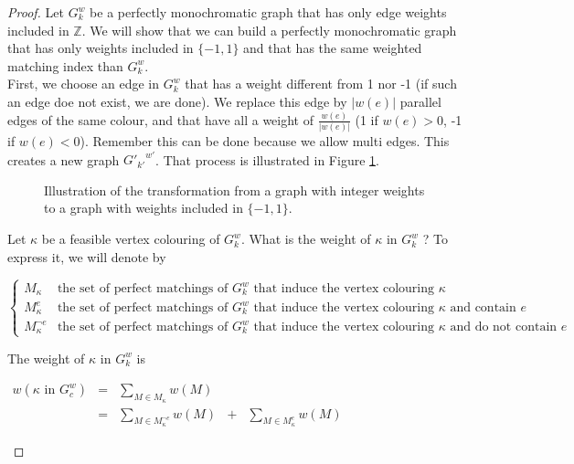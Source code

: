 \begin{proof}
    Let $G_k^w$ be a perfectly monochromatic graph that has only edge weights included in $\mathbb{Z}$. We will show that we can build a perfectly monochromatic graph that has only weights included in $\{-1, 1\}$ and that has the same weighted matching index than $G_k^w$. \\

    First, we choose an edge in $G_k^w$ that has a weight different from 1 nor -1 (if such an edge doe not exist, we are done). We replace this edge by $|w(e)|$ parallel edges of the same colour, and that have all a weight of $\frac{w(e)}{|w(e)|}$ (1 if $w(e) > 0$, -1 if $w(e) < 0$). Remember this can be done because we allow multi edges. This creates a new graph ${G'_{k'}}^{w'}$. That process is illustrated in Figure \ref{fig:demo_integers}.\\

    \begin{figure}[H]
        \caption{Illustration of the transformation from a graph with integer weights to a graph with weights included in $\{-1, 1\}$.}
        \label{fig:demo_integers}
    \end{figure}
    
    Let $\kappa$ be a feasible vertex colouring of $G_k^w$. What is the weight of $\kappa$ in $G_k^w$ ? To express it, we will denote by 
    \begin{center}
        $\left\{
            \begin{array}{ll}
                M_{\kappa}          & \mbox{the set of perfect matchings of } G_k^w \mbox{ that induce the vertex colouring } \kappa \\
                M_{\kappa}^e        & \mbox{the set of perfect matchings of } G_k^w \mbox{ that induce the vertex colouring } \kappa \mbox{ and contain } e \\
                M_{\kappa}^{\neg e} & \mbox{the set of perfect matchings of } G_k^w \mbox{ that induce the vertex colouring } \kappa \mbox{ and do not contain } e
            \end{array}
        \right.$
    \end{center}

    The weight of $\kappa$ in $G_k^w$ is
    
    \begin{center}
        $\begin{array}{lclcl}
            w(\kappa \mbox{ in } G_c^w) 
                & = & \sum\limits_{M \in M_{\kappa}} w(M) \\
                & = & \sum\limits_{M \in M_{\kappa}^{\neg e}} w(M) & + & \sum\limits_{M \in M_{\kappa}^{e}} w(M)
        \end{array}$
    \end{center}


\end{proof}
